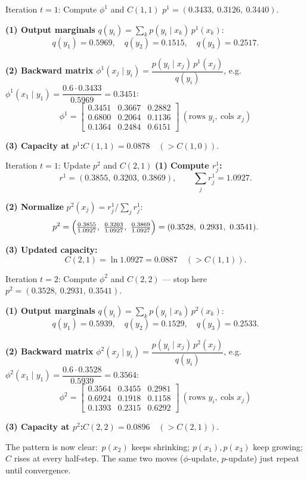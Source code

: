\documentclass{beamer}
\begin{document}
\begin{frame}{Iteration $t=1$: Compute $\phi^1$ and $C(1,1)$}
    \footnotesize
    $p^1=(0.3433,\ 0.3126,\ 0.3440)$.
    \medskip

    \textbf{(1) Output marginals } $q(y_i)=\sum_k p(y_i\mid x_k)\,p^1(x_k)$:
    $$
    q(y_1)=0.5969,\quad q(y_2)=0.1515,\quad q(y_3)=0.2517.
    $$

    \textbf{(2) Backward matrix } $\phi^1(x_j\mid y_i)=\dfrac{p(y_i\mid x_j)\,p^1(x_j)}{q(y_i)}$,\;
    e.g.\ $\phi^1(x_1\mid y_1)=\dfrac{0.6\cdot0.3433}{0.5969}=0.3451$:
    $$
    \phi^1=
    \begin{bmatrix}
        0.3451 & 0.3667 & 0.2882 \\
        0.6800 & 0.2064 & 0.1136 \\
        0.1364 & 0.2484 & 0.6151
    \end{bmatrix}\ (\text{rows }y_i,\ \text{cols }x_j)
    $$

    \textbf{(3) Capacity at $p^1$:}\quad $C(1,1)=0.0878\quad(>C(1,0)).$
\end{frame}

\begin{frame}{Iteration $t=1$: Update $p^2$ and $C(2,1)$}
    \footnotesize
    \textbf{(1) Compute $r_j^1$:}
    $$
    r^1=(0.3855,\ 0.3203,\ 0.3869),\qquad \textstyle\sum_j r_j^1=1.0927.
    $$

    \textbf{(2) Normalize } $p^2(x_j)=r_j^1\big/\sum_j r_j^1$:
    $$
    p^2=\Bigl(\tfrac{0.3855}{1.0927},\ \tfrac{0.3203}{1.0927},\ \tfrac{0.3869}{1.0927}\Bigr)=(0.3528,\ 0.2931,\ 0.3541).
    $$

    \textbf{(3) Updated capacity:}
    $$
    C(2,1)=\ln 1.0927=0.0887\quad(>C(1,1)).
    $$
\end{frame}

\begin{frame}{Iteration $t=2$: Compute $\phi^2$ and $C(2,2)$ --- stop here}
    \footnotesize
    $p^2=(0.3528,\ 0.2931,\ 0.3541)$.
    \medskip

    \textbf{(1) Output marginals } $q(y_i)=\sum_k p(y_i\mid x_k)\,p^2(x_k)$:
    $$
    q(y_1)=0.5939,\quad q(y_2)=0.1529,\quad q(y_3)=0.2533.
    $$

    \textbf{(2) Backward matrix } $\phi^2(x_j\mid y_i)=\dfrac{p(y_i\mid x_j)\,p^2(x_j)}{q(y_i)}$,\;
    e.g.\ $\phi^2(x_1\mid y_1)=\dfrac{0.6\cdot0.3528}{0.5939}=0.3564$:
    $$
    \phi^2=
    \begin{bmatrix}
        0.3564 & 0.3455 & 0.2981 \\
        0.6924 & 0.1918 & 0.1158 \\
        0.1393 & 0.2315 & 0.6292
    \end{bmatrix}\ (\text{rows }y_i,\ \text{cols }x_j)
    $$

    \textbf{(3) Capacity at $p^2$:}\quad $C(2,2)=0.0896\quad(>C(2,1)).$
    \medskip

    \alert{The pattern is now clear:}\ $p(x_2)$ keeps shrinking; $p(x_1),p(x_3)$ keep growing; $C$ rises at every half-step. The same two moves ($\phi$-update, $p$-update) just repeat until convergence.
\end{frame}
\end{document}
